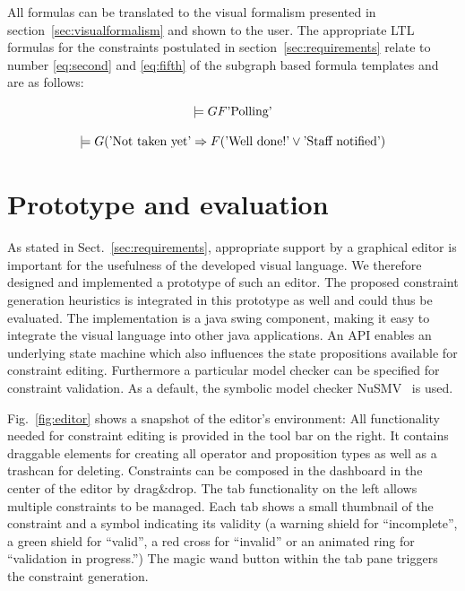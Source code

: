 \documentclass[conference]{IEEEtran}
\begin{document}
All formulas can be translated to the visual formalism presented in section~\ref{sec:visualformalism} and shown to the user. The appropriate LTL formulas for the constraints postulated in section~\ref{sec:requirements} relate to number \ref{eq:second} and \ref{eq:fifth} of the subgraph based formula templates and are as follows:

\begin{equation}
  \models G F \textnormal{'Polling'}
\end{equation}

\begin{equation}
	\models G (\textnormal{'Not taken yet'} \Rightarrow F (\textnormal{'Well done!'} \vee \textnormal{'Staff notified'})
\end{equation}


\section{Prototype and evaluation}

As stated in Sect.~\ref{sec:requirements}, appropriate support by a graphical editor is important for the usefulness of the developed visual language. We therefore designed and implemented a prototype of such an editor. The proposed constraint generation heuristics is integrated in this prototype as well and could thus be evaluated. The implementation is a java swing component, making it easy to integrate the visual language into other java applications. An API enables an underlying state machine which also influences the state propositions available for constraint editing. Furthermore a particular model checker can be specified for constraint validation. As a default, the symbolic model checker NuSMV~\cite{springerlink:10.1007/s100090050046,NuSMV2} is used.

Fig.~\ref{fig:editor} shows a snapshot of the editor's environment: All functionality needed for constraint editing is provided in the tool bar on the right. It contains draggable elements for creating all operator and proposition types as well as a trashcan for deleting. Constraints can be composed in the dashboard in the center of the editor by drag\&drop. The tab functionality on the left allows multiple constraints to be managed. Each tab shows a small thumbnail of the constraint and a symbol indicating its validity (a warning shield for ``incomplete'', a green shield for ``valid'', a red cross for ``invalid'' or an animated ring for ``validation in progress.'') The magic wand button within the tab pane triggers the constraint generation.
\end{document}
